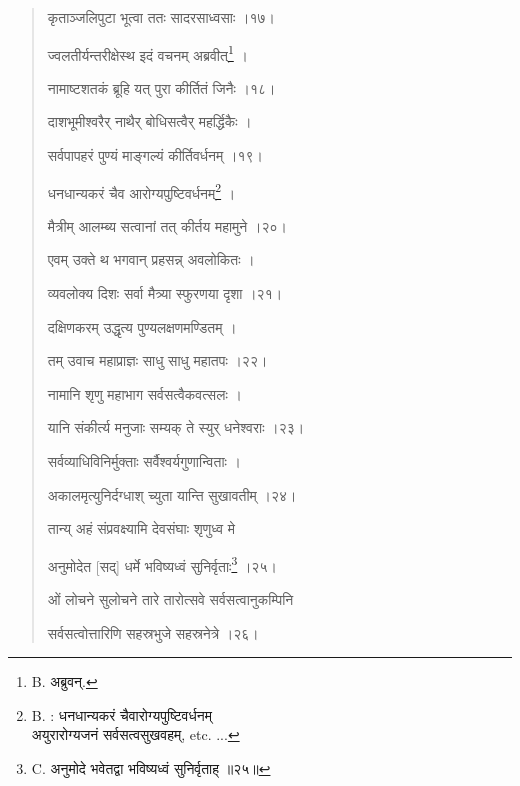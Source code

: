 \documentclass[a4paper, 11pt, oneside, french]{article}
\begin{document}
\begin{quotation}
\texthindi{कृताञ्जलिपुटा भूत्वा ततः सादरसाध्वसाः ।१७।}

\bigskip

\texthindi{ज्वलतीर्यन्तरीक्षेस्थ इदं वचनम् अब्रवीत्\footnote{B. \texthindi{अब्रुवन्}.} ।}

\texthindi{नामाष्टशतकं ब्रूहि यत् पुरा कीर्तितं जिनैः ।१८।}

\bigskip

\texthindi{दाशभूमीश्वरैर् नाथैर् बोधिसत्वैर् महर्द्धिकैः ।}

\texthindi{सर्वपापहरं पुण्यं माङ्गल्यं कीर्तिवर्धनम् ।१९।}

\bigskip

\texthindi{धनधान्यकरं चैव आरोग्यपुष्टिवर्धनम्\footnote{B. : \texthindi{धनधान्यकरं चैवारोग्यपुष्टिवर्धनम्}\\\hspace*{10mm}\texthindi{अयुरारोग्यजनं सर्वसत्वसुखवहम्}, etc. ...} ।}

\texthindi{मैत्रीम् आलम्ब्य सत्वानां तत् कीर्तय महामुने ।२०।}

\bigskip

\texthindi{एवम् उक्ते थ भगवान् प्रहसन्न् अवलोकितः ।}

\texthindi{व्यवलोक्य दिशः सर्वा मैत्र्या स्फुरणया दृशा ।२१।}

\bigskip

\texthindi{दक्षिणकरम् उद्धृत्य पुण्यलक्षणमण्डितम् ।}

\texthindi{तम् उवाच महाप्राज्ञः साधु साधु महातपः ।२२।}

\bigskip

\texthindi{नामानि शृणु महाभाग सर्वसत्वैकवत्सलः ।}

\texthindi{यानि संकीर्त्य मनुजाः सम्यक् ते स्युर् धनेश्वराः ।२३।}

\bigskip

\texthindi{सर्वव्याधिविनिर्मुक्ताः सर्वैश्वर्यगुणान्विताः ।}

\texthindi{अकालमृत्युनिर्दग्धाश् च्युता यान्ति सुखावतीम् ।२४।}

\bigskip

\texthindi{तान्य् अहं संप्रवक्ष्यामि देवसंघाः शृणुध्व मे}

\texthindi{अनुमोदेत [सद्] धर्मे भविष्यध्वं सुनिर्वृताः\footnote{C. \texthindi{अनुमोदे भवेतद्वा भविष्यध्वं सुनिर्वृताह् ॥२५॥}} ।२५।}

\bigskip

\texthindi{ओं लोचने सुलोचने तारे तारोत्सवे सर्वसत्वानुकम्पिनि}

\texthindi{सर्वसत्वोत्तारिणि सहस्रभुजे सहस्रनेत्रे ।२६।}


\end{quotation}
\end{document}
